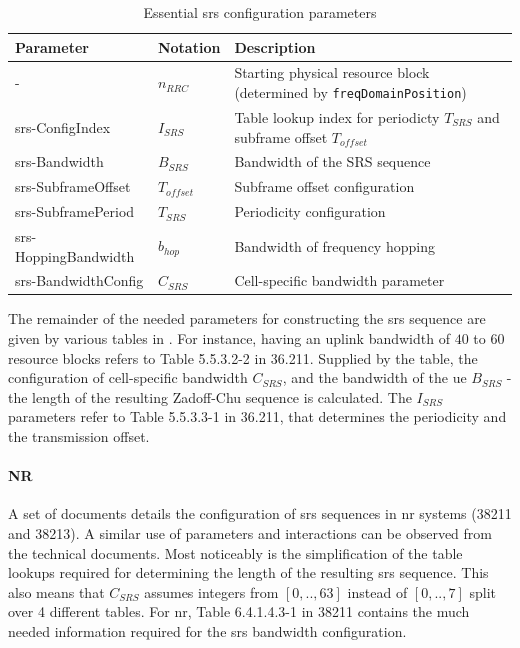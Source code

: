 \begin{table}[]
\begin{tabular}{@{}llp{8cm}@{}}
\toprule
Parameter            & Notation  & Description                                                           \\ \midrule
-                    & $n_{RRC}$    & Starting physical resource block (determined by \texttt{freqDomainPosition})   \\
srs-ConfigIndex      & $I_{SRS}$    & Table lookup index for periodicty $T_{SRS}$ and subframe offset $T_{offset}$   \\
srs-Bandwidth        & $B_{SRS}$    & Bandwidth of the SRS sequence                                        \\
srs-SubframeOffset   & $T_{offset}$ & Subframe offset configuration                                         \\
srs-SubframePeriod   & $T_{SRS}$    & Periodicity configuration                                             \\
srs-HoppingBandwidth & $b_{hop}$    & Bandwidth of frequency hopping                                        \\
srs-BandwidthConfig  & $C_{SRS}$    & Cell-specific bandwidth parameter                                     \\ \bottomrule
\end{tabular}
\vspace{1em}
\caption{Essential \gls{srs} configuration parameters}\label{tab:srs_config_param}
\end{table}

The remainder of the needed parameters for constructing the \gls{srs} sequence are given by various tables in \cite{36211,3GPP2020TS15}. For instance, having an uplink bandwidth of $40$ to $60$ resource blocks refers to Table 5.5.3.2-2 in 36.211. Supplied by the table, the configuration of cell-specific bandwidth $C_{SRS}$, and the bandwidth of the \gls{ue} $B_{SRS}$ - the length of the resulting Zadoff-Chu sequence is calculated. The $I_{SRS}$ parameters refer to Table 5.5.3.3-1 in 36.211, that determines the periodicity and the transmission offset.


\paragraph{NR}
A set of documents details the configuration of \gls{srs} sequences in \gls{nr} systems \cite{38211, 3GPP2020TS15b} (38211 and 38213). A similar use of parameters and interactions can be observed from the technical documents. Most noticeably is the simplification of the table lookups required for determining the length of the resulting \gls{srs} sequence. This also means that $C_{SRS}$ assumes integers from $[0,.., 63]$ instead of $[0,..,7]$ split over 4 different tables. For \gls{nr}, Table 6.4.1.4.3-1 in 38211 contains the much needed information required for the \gls{srs} bandwidth configuration.
